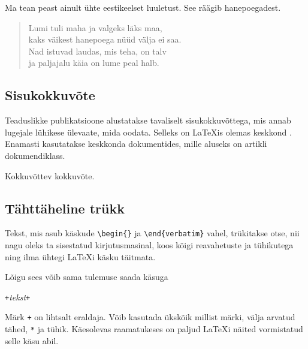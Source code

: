 \begin{example}
Ma tean peast ainult ühte
eestikeelset luuletust.
See räägib hanepoegadest.
\begin{flushleft}
\begin{verse}
Lumi tuli maha ja
valgeks läks maa,\\
kaks väikest hanepoega nüüd
välja ei saa.\\
Nad istuvad laudas, mis
teha, on talv\\
ja paljajalu käia on
lume peal halb.
\end{verse}
\end{flushleft}
\end{example}

\subsection{Sisukokkuvõte}

Teaduslikke publikatsioone alustatakse tavaliselt sisukokkuvõttega, mis
annab lugejale lühikese ülevaate, mida oodata. Selleks on \LaTeX is
olemas keskkond . Enamasti kasutatakse keskkonda
 dokumentides, mille aluseks on artikli dokumendiklass.

\newenvironment{abstract}%
        {\begin{center}\begin{small}\begin{minipage}{0.8\textwidth}}%
        {\end{minipage}\end{small}\end{center}}
\begin{example}
\begin{abstract}
Kokkuvõttev kokkuvõte.
\end{abstract}
\end{example}

\subsection{Tähttäheline trükk}

Tekst, mis asub käskude \verb|\begin{|\verb|}| ja
\verb|\end{verbatim}| vahel, trükitakse otse, nii nagu oleks ta
sisestatud kirjutusmasinal, koos kõigi reavahetuste ja tühikutega ning
ilma ühtegi \LaTeX i käsku täitmata.

Lõigu sees võib sama tulemuse saada käsuga
\begin{lscommand}
\verb|+|\emph{tekst}\verb|+|
\end{lscommand}
\noindent Märk \verb|+| on lihtsalt eraldaja. Võib kasutada ükskõik
millist märki, välja arvatud tähed, \verb|*| ja tühik. Käesolevas
raamatukeses on paljud \LaTeX i näited vormistatud selle käsu abil.

